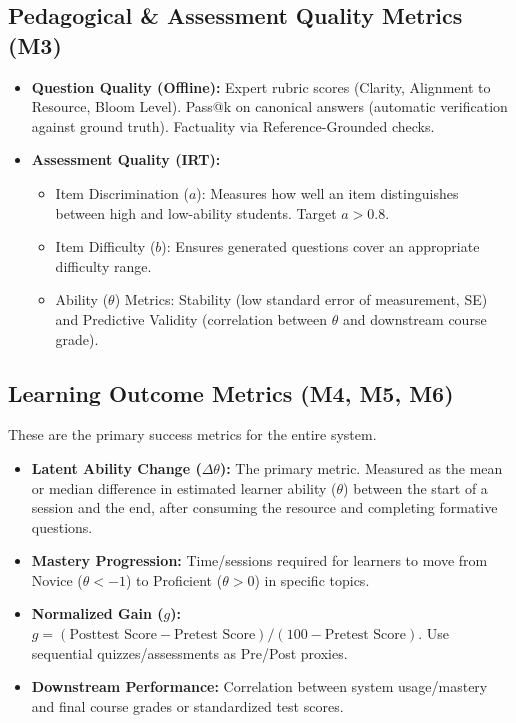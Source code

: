 \documentclass[12pt]{article}
\begin{document}
\begin{enumerate}
\subsection{Pedagogical \& Assessment Quality Metrics (M3)}
\begin{itemize}[noitemsep]
    \item \textbf{Question Quality (Offline):} Expert rubric scores (Clarity, Alignment to Resource, Bloom Level). Pass@k on canonical answers (automatic verification against ground truth). Factuality via Reference-Grounded checks.
    \item \textbf{Assessment Quality (IRT):}
    \begin{itemize}
        \item Item Discrimination ($a$): Measures how well an item distinguishes between high and low-ability students. Target $a>0.8$.
        \item Item Difficulty ($b$): Ensures generated questions cover an appropriate difficulty range.
        \item Ability ($\theta$) Metrics: Stability (low standard error of measurement, SE) and Predictive Validity (correlation between $\theta$ and downstream course grade).
    \end{itemize}
\end{itemize}

\subsection{Learning Outcome Metrics (M4, M5, M6)}
These are the primary success metrics for the entire system.
\begin{itemize}[noitemsep]
    \item \textbf{Latent Ability Change ($\Delta\theta$):} The primary metric. Measured as the mean or median difference in estimated learner ability ($\theta$) between the start of a session and the end, after consuming the resource and completing formative questions.
    \item \textbf{Mastery Progression:} Time/sessions required for learners to move from Novice ($\theta < -1$) to Proficient ($\theta > 0$) in specific topics.
    \item \textbf{Normalized Gain ($g$):} $g = (\text{Posttest Score} - \text{Pretest Score}) / (100 - \text{Pretest Score})$. Use sequential quizzes/assessments as Pre/Post proxies.
    \item \textbf{Downstream Performance:} Correlation between system usage/mastery and final course grades or standardized test scores.
\end{itemize}


\end{enumerate}
\end{document}
